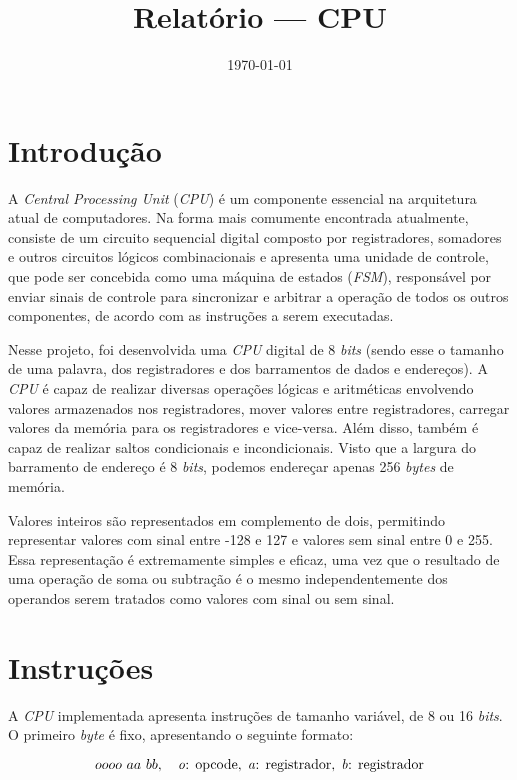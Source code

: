 \documentclass[a4paper,12pt]{report}
\title{Relatório --- CPU}
\date{\today}
\begin{document}
\maketitle

\section*{Introdução}

A \textit{Central Processing Unit} (\textit{CPU}) é um componente essencial
na arquitetura atual de computadores. Na forma mais comumente encontrada atualmente,
consiste de um circuito sequencial digital composto por registradores, somadores
e outros circuitos lógicos combinacionais e apresenta uma unidade de controle,
que pode ser concebida como uma máquina de estados (\textit{FSM}), responsável 
por enviar sinais de controle para sincronizar e arbitrar a operação de todos 
os outros componentes, de acordo com as instruções a serem executadas.

Nesse projeto, foi desenvolvida uma \textit{CPU} digital de 8 \textit{bits} (sendo
esse o tamanho de uma palavra, dos registradores e dos barramentos de dados e endereços).
A \textit{CPU} é capaz de realizar diversas operações lógicas e aritméticas 
envolvendo valores armazenados nos registradores, mover valores entre registradores,
carregar valores da memória para os registradores e vice-versa. Além disso, também é 
capaz de realizar saltos condicionais e incondicionais. Visto que a largura do 
barramento de endereço é 8 \textit{bits}, podemos endereçar apenas 256 \textit{bytes} 
de memória. 

Valores inteiros são representados em complemento de dois, permitindo
representar valores com sinal entre -128 e 127 e valores sem sinal entre 0 e 255.
Essa representação é extremamente simples e eficaz, uma vez que o resultado de
uma operação de soma ou subtração é o mesmo independentemente dos operandos serem 
tratados como valores com sinal ou sem sinal.

\section*{Instruções}

A \textit{CPU} implementada apresenta instruções de tamanho variável, de 8 ou 16 
\textit{bits}. O primeiro \textit{byte} é fixo, apresentando o seguinte formato:

\[
	oooo\ aa\ bb, \quad \textrm{\textit{o}: opcode}, \; \textrm{\textit{a}: registrador}, \; \textrm{\textit{b}: registrador}
\]
\end{document}
